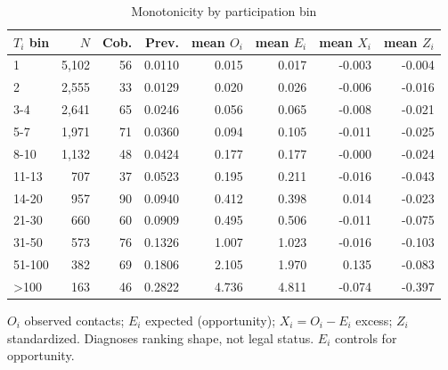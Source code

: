 \begin{table}[htbp]\centering\footnotesize
\caption{Monotonicity by participation bin}
\label{tab:monotonicity_bins}
\begin{tabular}{lrrrrrrr}\hline
$T_i$ bin & $N$ & Cob. & Prev. & mean $O_i$ & mean $E_i$ & mean $X_i$ & mean $Z_i$ \\\hline
1 & 5,102 & 56 & 0.0110 & 0.015 & 0.017 & -0.003 & -0.004 \\
2 & 2,555 & 33 & 0.0129 & 0.020 & 0.026 & -0.006 & -0.016 \\
3-4 & 2,641 & 65 & 0.0246 & 0.056 & 0.065 & -0.008 & -0.021 \\
5-7 & 1,971 & 71 & 0.0360 & 0.094 & 0.105 & -0.011 & -0.025 \\
8-10 & 1,132 & 48 & 0.0424 & 0.177 & 0.177 & -0.000 & -0.024 \\
11-13 & 707 & 37 & 0.0523 & 0.195 & 0.211 & -0.016 & -0.043 \\
14-20 & 957 & 90 & 0.0940 & 0.412 & 0.398 & 0.014 & -0.023 \\
21-30 & 660 & 60 & 0.0909 & 0.495 & 0.506 & -0.011 & -0.075 \\
31-50 & 573 & 76 & 0.1326 & 1.007 & 1.023 & -0.016 & -0.103 \\
51-100 & 382 & 69 & 0.1806 & 2.105 & 1.970 & 0.135 & -0.083 \\
>100 & 163 & 46 & 0.2822 & 4.736 & 4.811 & -0.074 & -0.397 \\
\hline\end{tabular}
\begin{tablenotes}\footnotesize\item $O_i$ observed contacts; $E_i$ expected (opportunity); $X_i=O_i-E_i$ excess; $Z_i$ standardized. Diagnoses ranking shape, not legal status. $E_i$ controls for opportunity.\end{tablenotes}
\end{table}
